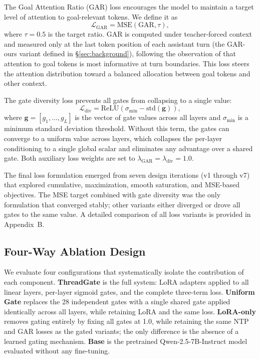 The Goal Attention Ratio (GAR) loss encourages the model to maintain a target level of attention to goal-relevant tokens. We define it as
\begin{equation}
  \mathcal{L}_\text{GAR} = \text{MSE}(\text{GAR}, \tau),
\end{equation}
where $\tau = 0.5$ is the target ratio. GAR is computed under teacher-forced context and measured only at the last token position of each assistant turn (the GAR-ours variant defined in \S\ref{sec:background}), following the observation of \citet{dongre2026attention} that attention to goal tokens is most informative at turn boundaries. This loss steers the attention distribution toward a balanced allocation between goal tokens and other context.

The gate diversity loss prevents all gates from collapsing to a single value:
\begin{equation}
  \mathcal{L}_\text{div} = \text{ReLU}(\sigma_\text{min} - \text{std}(\mathbf{g})),
\end{equation}
where $\mathbf{g} = [g_1, \ldots, g_L]$ is the vector of gate values across all layers and $\sigma_\text{min}$ is a minimum standard deviation threshold. Without this term, the gates can converge to a uniform value across layers, which collapses the per-layer conditioning to a single global scalar and eliminates any advantage over a shared gate. Both auxiliary loss weights are set to $\lambda_\text{GAR} = \lambda_\text{div} = 1.0$.

The final loss formulation emerged from seven design iterations (v1 through v7) that explored cumulative, maximization, smooth saturation, and MSE-based objectives. The MSE target combined with gate diversity was the only formulation that converged stably; other variants either diverged or drove all gates to the same value. A detailed comparison of all loss variants is provided in Appendix~B.

\subsection{Four-Way Ablation Design}

We evaluate four configurations that systematically isolate the contribution of each component. \textbf{ThreadGate} is the full system: LoRA adapters applied to all linear layers, per-layer sigmoid gates, and the complete three-term loss. \textbf{Uniform Gate} replaces the 28 independent gates with a single shared gate applied identically across all layers, while retaining LoRA and the same loss. \textbf{LoRA-only} removes gating entirely by fixing all gates at 1.0, while retaining the same NTP and GAR losses as the gated variants; the only difference is the absence of a learned gating mechanism. \textbf{Base} is the pretrained Qwen-2.5-7B-Instruct model evaluated without any fine-tuning.

